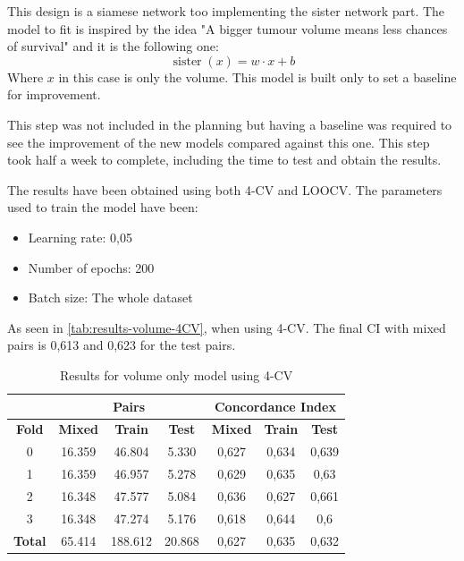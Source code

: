 This design is a siamese network too implementing the sister network part. The model to fit
is inspired by the idea "A bigger tumour volume means less chances of survival" 
and it is the following one:
\[
  \operatorname{sister}(x) = w\cdot x + b
\]
Where \( x \) in this case is only the volume. This model is built only to set a 
baseline for improvement.

This step was not included in the planning but having a baseline was required to see the 
improvement of the new models compared against this one. This step took half a week to complete,
including the time to test and obtain the results.


The results have been obtained using both 4-CV and \gls{LOOCV}. The parameters used to 
train the model have been:
\begin{itemize}
  \item Learning rate: 0,05
  \item Number of epochs: 200
  \item Batch size: The whole dataset
\end{itemize}

As seen in \autoref{tab:results-volume-4CV}, when using 4-CV. The final \gls{CI} with mixed pairs
is 0,613 and 0,623 for the test pairs.

\begin{table}
  \centering
  \begin{tabular}{|c||c|c|c||c|c|c|}
    \cline{2-7}
    \multicolumn{1}{c|}{} & \multicolumn{3}{|c||}{\textbf{Pairs}} & 
    \multicolumn{3}{c|}{\textbf{Concordance Index}} \\
    \hline
    \textbf{Fold} & \textbf{Mixed} & \textbf{Train} & \textbf{Test} 
    & \textbf{Mixed} & \textbf{Train} & \textbf{Test} \\
    \hhline{=======}
    0 & 16.359 & 46.804 & 5.330 & 0,627 & 0,634 & 0,639 \\
    1 & 16.359 & 46.957 & 5.278 & 0,629 & 0,635 & 0,63 \\
    2 & 16.348 & 47.577 & 5.084 & 0,636 & 0,627 & 0,661 \\
    3 & 16.348 & 47.274 & 5.176 & 0,618 & 0,644 & 0,6 \\
    \hhline{=======}
    \textbf{Total} & 65.414 & 188.612 & 20.868 & 0,627 & 0,635 & 0,632 \\
    \hline
  \end{tabular}

  \caption[Volume Only 4-CV results]{
    Results for volume only model using 4-CV \label{tab:results-volume-4CV}
  }
\end{table}


